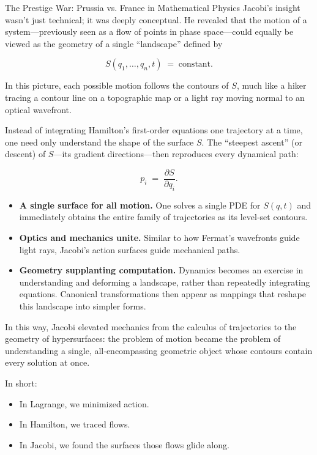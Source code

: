 \begin{HistoricalSidebar}{The Prestige War: Prussia vs. France in Mathematical Physics}
Jacobi’s insight wasn’t just technical; it was deeply conceptual.  He revealed that the motion of a system—previously seen as a flow of points in phase space—could equally be viewed as the geometry of a single “landscape” defined by

\[
S(q_1,\dots,q_n,t) \;=\;\text{constant}.
\]

In this picture, each possible motion follows the contours of \(S\), much like a hiker tracing a contour line on a topographic map or a light ray moving normal to an optical wavefront.

Instead of integrating Hamilton’s first‐order equations one trajectory at a time, one need only understand the shape of the surface \(S\).  The “steepest ascent” (or descent) of \(S\)—its gradient directions—then reproduces every dynamical path:

\[
p_i \;=\;\frac{\partial S}{\partial q_i}.
\]

\begin{itemize}
  \item \textbf{A single surface for all motion.}  One solves a single PDE for \(S(q,t)\) and immediately obtains the entire family of trajectories as its level‐set contours.
  \item \textbf{Optics and mechanics unite.}  Similar to how Fermat’s wavefronts guide light rays, Jacobi’s action surfaces guide mechanical paths.
  \item \textbf{Geometry supplanting computation.}  Dynamics becomes an exercise in understanding and deforming a landscape, rather than repeatedly integrating equations.  Canonical transformations then appear as mappings that reshape this landscape into simpler forms.
\end{itemize}

In this way, Jacobi elevated mechanics from the calculus of trajectories to the geometry of hypersurfaces:  
the problem of motion became the problem of understanding a single, all‐encompassing geometric object whose contours contain every solution at once.  

In short: 

\begin{itemize}
  \item In Lagrange, we minimized action.  
  \item In Hamilton, we traced flows.  
  \item In Jacobi, we found the surfaces those flows glide along.
\end{itemize}



\end{HistoricalSidebar}
